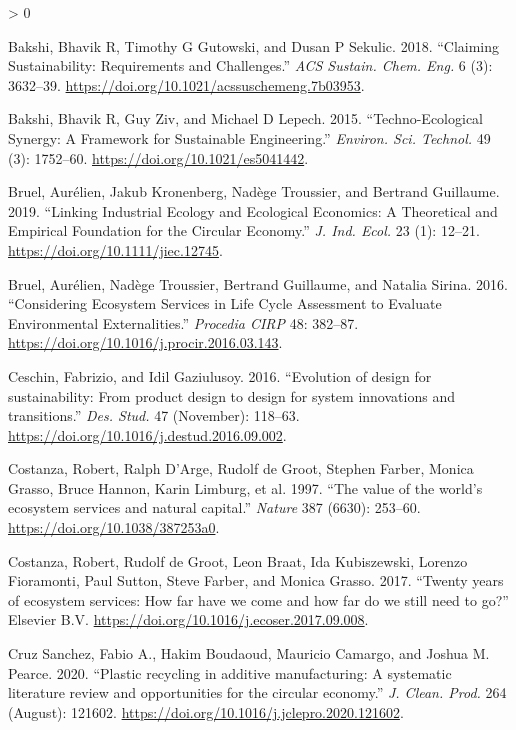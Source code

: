 \documentclass[
]{article}
\newlength{\cslhangindent}
\newenvironment{CSLReferences}[2] %
 {%
  \setlength{\parindent}{0pt}
  \ifodd #1 \everypar{\setlength{\hangindent}{\cslhangindent}}\ignorespaces\fi
  \ifnum #2 > 0
  \setlength{\parskip}{#2\baselineskip}
  \fi
 }%
 {}
\begin{document}
\hypertarget{refs}{}
\begin{CSLReferences}{1}{0}
\leavevmode\hypertarget{ref-Bakshi2018}{}%
Bakshi, Bhavik R, Timothy G Gutowski, and Dusan P Sekulic. 2018. {``{Claiming Sustainability: Requirements and Challenges}.''} \emph{ACS Sustain. Chem. Eng.} 6 (3): 3632--39. \url{https://doi.org/10.1021/acssuschemeng.7b03953}.

\leavevmode\hypertarget{ref-Bakshi2015}{}%
Bakshi, Bhavik R, Guy Ziv, and Michael D Lepech. 2015. {``{Techno-Ecological Synergy: A Framework for Sustainable Engineering}.''} \emph{Environ. Sci. Technol.} 49 (3): 1752--60. \url{https://doi.org/10.1021/es5041442}.

\leavevmode\hypertarget{ref-Bruel2018}{}%
Bruel, Aurélien, Jakub Kronenberg, Nadège Troussier, and Bertrand Guillaume. 2019. {``{Linking Industrial Ecology and Ecological Economics: A Theoretical and Empirical Foundation for the Circular Economy}.''} \emph{J. Ind. Ecol.} 23 (1): 12--21. \url{https://doi.org/10.1111/jiec.12745}.

\leavevmode\hypertarget{ref-Bruel2016}{}%
Bruel, Aurélien, Nadège Troussier, Bertrand Guillaume, and Natalia Sirina. 2016. {``{Considering Ecosystem Services in Life Cycle Assessment to Evaluate Environmental Externalities}.''} \emph{Procedia CIRP} 48: 382--87. \url{https://doi.org/10.1016/j.procir.2016.03.143}.

\leavevmode\hypertarget{ref-Ceschin2016}{}%
Ceschin, Fabrizio, and Idil Gaziulusoy. 2016. {``{Evolution of design for sustainability: From product design to design for system innovations and transitions}.''} \emph{Des. Stud.} 47 (November): 118--63. \url{https://doi.org/10.1016/j.destud.2016.09.002}.

\leavevmode\hypertarget{ref-Costanza1997}{}%
Costanza, Robert, Ralph D'Arge, Rudolf de Groot, Stephen Farber, Monica Grasso, Bruce Hannon, Karin Limburg, et al. 1997. {``{The value of the world's ecosystem services and natural capital}.''} \emph{Nature} 387 (6630): 253--60. \url{https://doi.org/10.1038/387253a0}.

\leavevmode\hypertarget{ref-Costanza2017}{}%
Costanza, Robert, Rudolf de Groot, Leon Braat, Ida Kubiszewski, Lorenzo Fioramonti, Paul Sutton, Steve Farber, and Monica Grasso. 2017. {``{Twenty years of ecosystem services: How far have we come and how far do we still need to go?}''} Elsevier B.V. \url{https://doi.org/10.1016/j.ecoser.2017.09.008}.

\leavevmode\hypertarget{ref-CruzSanchez2020}{}%
Cruz Sanchez, Fabio A., Hakim Boudaoud, Mauricio Camargo, and Joshua M. Pearce. 2020. {``{Plastic recycling in additive manufacturing: A systematic literature review and opportunities for the circular economy}.''} \emph{J. Clean. Prod.} 264 (August): 121602. \url{https://doi.org/10.1016/j.jclepro.2020.121602}.


\end{CSLReferences}
\end{document}
